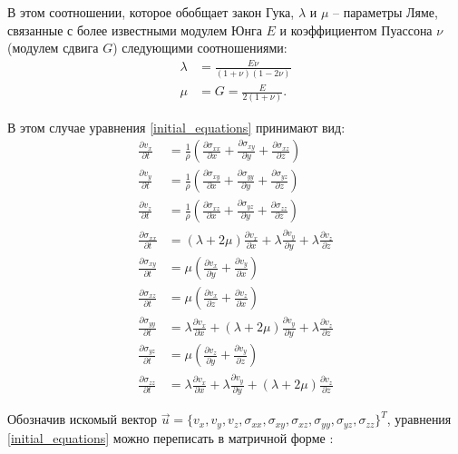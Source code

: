 В этом соотношении, которое обобщает закон Гука, $\lambda$ и $\mu$ -- параметры
Ляме, связанные с более известными модулем Юнга $E$ и коэффициентом Пуассона $\nu$ (модулем сдвига $G$) следующими соотношениями:
\begin{eqnarray}
\label{lame_parameters}
	\lambda &= \frac{E\nu}{(1+\nu)(1-2\nu)}
	\nonumber\\
	\mu &= G=\frac{E}{2(1+\nu)}.
\end{eqnarray}


В этом случае уравнения \eqref{initial_equations} принимают вид:
\begin{align}
	\label{simple_equations}
	\frac{\partial{v_x}}{\partial{t}}&=\frac{1}{\rho}(\frac{\partial{\sigma_{xx}}}{\partial{x}}+\frac{\partial{\sigma_{xy}}}{\partial{y}}+\frac{\partial{\sigma_{xz}}}{\partial{z}})
	\nonumber\\
	\frac{\partial{v_y}}{\partial{t}}&=\frac{1}{\rho}(\frac{\partial{\sigma_{xy}}}{\partial{x}}+\frac{\partial{\sigma_{yy}}}{\partial{y}}+\frac{\partial{\sigma_{yz}}}{\partial{z}})
	\nonumber\\
	\frac{\partial{v_z}}{\partial{t}}&=\frac{1}{\rho}(\frac{\partial{\sigma_{xz}}}{\partial{x}}+\frac{\partial{\sigma_{yz}}}{\partial{y}}+\frac{\partial{\sigma_{zz}}}{\partial{z}})
	\nonumber\\
	\frac{\partial{\sigma_{xx}}}{\partial{t}}&=(\lambda+2\mu)\frac{\partial{v_x}}{\partial{x}}+\lambda\frac{\partial{v_y}}{\partial{y}}+\lambda\frac{\partial{v_z}}{\partial{z}}
	\nonumber\\
	\frac{\partial{\sigma_{xy}}}{\partial{t}}&=\mu(\frac{\partial{v_x}}{\partial{y}}+\frac{\partial{v_y}}{\partial{x}})
	\nonumber\\
	\frac{\partial{\sigma_{xz}}}{\partial{t}}&=\mu(\frac{\partial{v_x}}{\partial{z}}+\frac{\partial{v_z}}{\partial{x}})
	\nonumber\\
	\frac{\partial{\sigma_{yy}}}{\partial{t}}&=\lambda\frac{\partial{v_x}}{\partial{x}}+(\lambda+2\mu)\frac{\partial{v_y}}{\partial{y}}+\lambda\frac{\partial{v_z}}{\partial{z}}
	\nonumber\\
	\frac{\partial{\sigma_{yz}}}{\partial{t}}&=\mu(\frac{\partial{v_z}}{\partial{y}}+\frac{\partial{v_y}}{\partial{z}})
	\nonumber\\
	\frac{\partial{\sigma_{zz}}}{\partial{t}}&=\lambda\frac{\partial{v_x}}{\partial{x}}+\lambda\frac{\partial{v_y}}{\partial{y}}+(\lambda+2\mu)\frac{\partial{v_z}}{\partial{z}}
\end{align}

Обозначив искомый вектор $\vec{u}=\{v_x,v_y,v_z,\sigma_{xx},\sigma_{xy},\sigma_{xz},\sigma_{yy},\sigma_{yz},\sigma_{zz}\}^T$, уравнения \eqref{initial_equations} можно переписать в матричной форме \cite{petrov_kholodov}:

